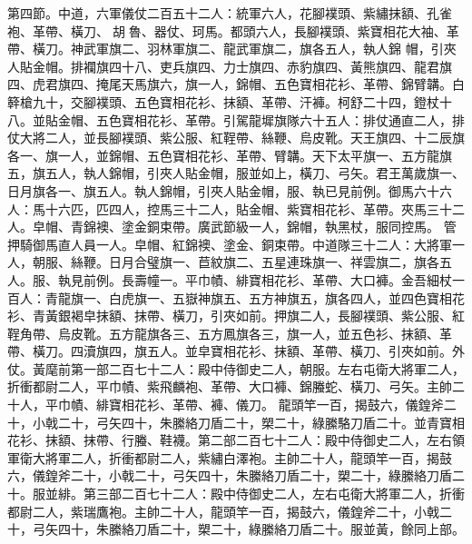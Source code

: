 \begin{pinyinscope}
 第四節。中道，六軍儀仗二百五十二人：統軍六人，花腳襆頭、紫繡抹額、孔雀袍、革帶、橫刀、胡魯、器仗、珂馬。都頭六人，長腳襆頭、紫寶相花大袖、革帶、橫刀。神武軍旗二、羽林軍旗二、龍武軍旗二，旗各五人，執人錦
 帽，引夾人貼金帽。排襴旗四十八、吏兵旗四、力士旗四、赤豹旗四、黃熊旗四、龍君旗四、虎君旗四、掩尾天馬旗六，旗一人，錦帽、五色寶相花衫、革帶、錦臂韝。白簳槍九十，交腳襆頭、五色寶相花衫、抹額、革帶、汗褲。柯舒二十四，鐙杖十八。並貼金帽、五色寶相花衫、革帶。引駕龍墀旗隊六十五人：排仗通直二人，排仗大將二人，並長腳襆頭、紫公服、紅鞓帶、絲鞭、烏皮靴。天王旗四、十二辰旗各一、旗一人，並錦帽、五色寶相花衫、革帶、臂韝。天下太平旗一、五方龍旗五，旗五人，執人錦帽，引夾人貼金帽，服並如上，橫刀、弓矢。君王萬歲旗一、日月旗各一、旗五人。執人錦帽，引夾人貼金帽，服、執已見前例。御馬六十六人：馬十六匹，匹四人，控馬三十二人，貼金帽、紫寶相花衫、革帶。夾馬三十二人。皁帽、青錦襖、塗金銅束帶。廣武節級一人，錦帽，執黑杖，服同控馬。
 管押騎御馬直人員一人。皁帽、紅錦襖、塗金、銅束帶。中道隊三十二人：大將軍一人，朝服、絲鞭。日月合璧旗一、苣紋旗二、五星連珠旗一、祥雲旗二，旗各五人。服、執見前例。長壽幢一。平巾幘、緋寶相花衫、革帶、大口褲。金吾細杖一百人：青龍旗一、白虎旗一、五嶽神旗五、五方神旗五，旗各四人，並四色寶相花衫、青黃銀褐皁抹額、抹帶、橫刀，引夾如前。押旗二人，長腳襆頭、紫公服、紅鞓角帶、烏皮靴。五方龍旗各三、五方鳳旗各三，旗一人，並五色衫、抹額、革帶、橫刀。四瀆旗四，旗五人。並皁寶相花衫、抹額、革帶、橫刀、引夾如前。外仗。黃麾前第一部二百七十二人：殿中侍御史二人，朝服。左右屯衛大將軍二人，折衝都尉二人，平巾幘、紫飛麟袍、革帶、大口褲、錦螣蛇、橫刀、弓矢。主帥二十人，平巾幘、緋寶相花衫、革帶、褲、儀刀。
 龍頭竿一百，揭鼓六，儀鍠斧二十，小戟二十，弓矢四十，朱縢絡刀盾二十，槊二十，綠縢駱刀盾二十。並青寶相花衫、抹額、抹帶、行螣、鞋襪。第二部二百七十二人：殿中侍御史二人，左右領軍衛大將軍二人，折衝都尉二人，紫繡白澤袍。主帥二十人，龍頭竿一百，揭鼓六，儀鍠斧二十，小戟二十，弓矢四十，朱縢絡刀盾二十，槊二十，綠縢絡刀盾二十。服並緋。第三部二百七十二人：殿中侍御史二人，左右屯衛大將軍二人，折衝都尉二人，紫瑞鷹袍。主帥二十人，龍頭竿一百，揭鼓六，儀鍠斧二十，小戟二十，弓矢四十，朱縢絡刀盾二十，槊二十，綠縢絡刀盾二十。服並黃，餘同上部。




\end{pinyinscope}
